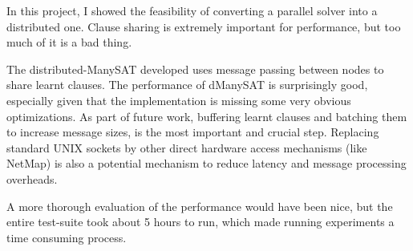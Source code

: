\documentclass{article}
\begin{document}
In this project, I showed the feasibility of converting a parallel
solver into a distributed one. Clause sharing is extremely important
for performance, but too much of it is a bad thing. 

The distributed-ManySAT developed uses message passing between nodes
to share learnt clauses. The performance of dManySAT is surprisingly
good, especially given that the implementation is missing some very
obvious optimizations. As part of future work, buffering learnt
clauses and batching them to increase message sizes, is the most
important and crucial step. Replacing standard UNIX sockets by other
direct hardware access mechanisms (like NetMap) is also a potential
mechanism to reduce latency and message processing overheads.

A more thorough evaluation of the performance would have been nice,
but the entire test-suite took about 5 hours to run, which made
running experiments a time consuming process. 



\end{document}
